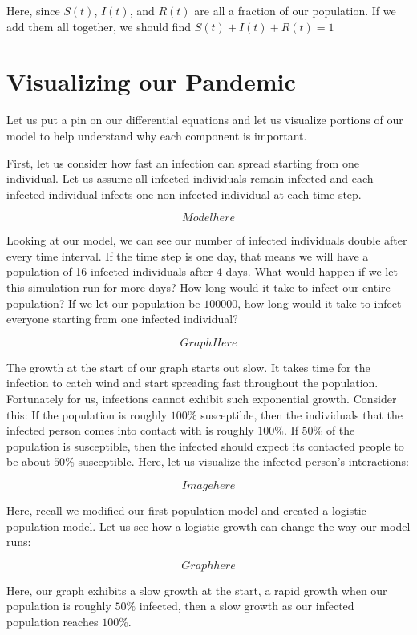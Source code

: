 \documentclass{amsart}
\theoremstyle{definition}
\numberwithin{equation}{section}
\begin{document}
\begin{sansmath}
Here, since $S(t)$, $I(t)$, and $R(t)$ are all a fraction of our population. If we add them all together, we should find $S(t) + I(t) + R(t) = 1$

\section{Visualizing our Pandemic}

Let us put a pin on our differential equations and let us visualize portions of our model to help understand why each component is important.

First, let us consider how fast an infection can spread starting from one individual. Let us assume all infected individuals remain infected and each infected individual infects one non-infected individual at each time step.

\[ Model here \]

Looking at our model, we can see our number of infected individuals double after every time interval. If the time step is one day, that means we will have a population of 16 infected individuals after 4 days. What would happen if we let this simulation run for more days? How long would it take to infect our entire population? If we let our population be $100000$, how long would it take to infect everyone starting from one infected individual?

\[ Graph Here \]

The growth at the start of our graph starts out slow. It takes time for the infection to catch wind and start spreading fast throughout the population. Fortunately for us, infections cannot exhibit such exponential growth. Consider this: If the population is roughly $100\%$ susceptible, then the individuals that the infected person comes into contact with is roughly $100\%$. If $50\%$ of the population is susceptible, then the infected should expect its contacted people to be about $50\%$ susceptible. Here, let us visualize the infected person's interactions:

\[ Image here \]

Here, recall we modified our first population model and created a logistic population model. Let us see how a logistic growth can change the way our model runs:

\[ Graph here \]

Here, our graph exhibits a slow growth at the start, a rapid growth when our population is roughly $50\%$ infected, then a slow growth as our infected population reaches $100\%$.


\end{sansmath}
\end{document}
